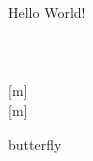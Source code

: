 \documentclass{article}
\newcommand{\comm}[1]{Hello #1!}
\begin{document}
\comm{World} \\
 \\

 \\
 \\
[m] \\
[m]

\begin{foo}
	butterfly
\end{foo}

\greeting \\
\greeting[Bye] \\
\greeting[][Tree] \\
\greetingUsedef[][Forrest] \\
\greetingUsedefAt[@][Sea] \\
\greetingUsedefAt[][Lake] \\
\end{document}
